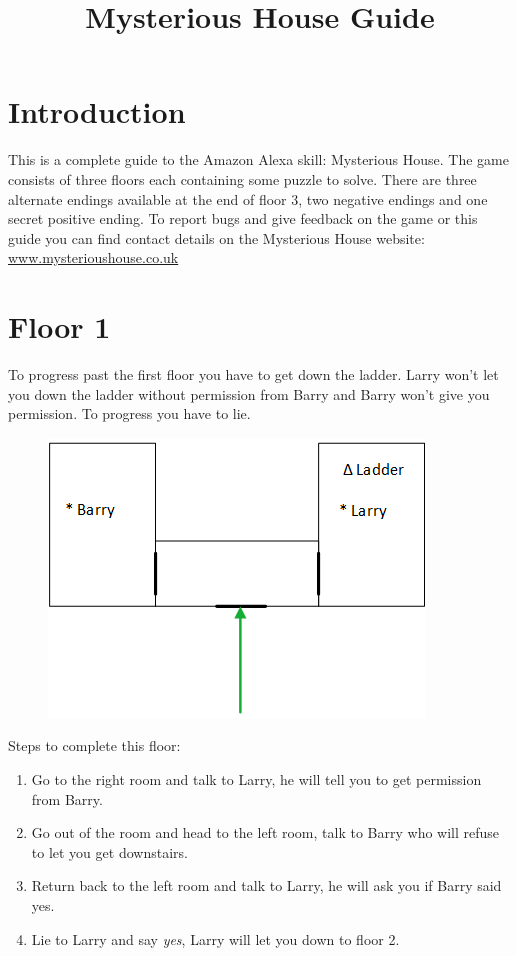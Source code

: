 \documentclass{article}
\begin{document}
\title{Mysterious House Guide}
\date{}
\maketitle

\section*{Introduction}
This is a complete guide to the Amazon Alexa skill: Mysterious House. 
The game consists of three floors each containing some puzzle to solve. 
There are three alternate endings available at the end of floor 3, two negative endings and one secret positive ending. To report bugs and give feedback on the game or this guide you can find contact details on the Mysterious House website: \url{www.mysterioushouse.co.uk}

\section*{Floor 1}
To progress past the first floor you have to get down the ladder.
Larry won't let you down the ladder without permission from Barry and Barry won't give you permission.
To progress you have to lie.

\begin{figure}[htb]
	\centering
	\includegraphics{Floor1.png}
\end{figure}

Steps to complete this floor:

\begin{enumerate}
	\item Go to the right room and talk to Larry, he will tell you to get permission from Barry.
	\item Go out of the room and head to the left room, talk to Barry who will refuse to let you get downstairs.
	\item Return back to the left room and talk to Larry, he will ask you if Barry said yes.
	\item Lie to Larry and say \textit{yes}, Larry will let you down to floor 2.
\end{enumerate}
\end{document}
